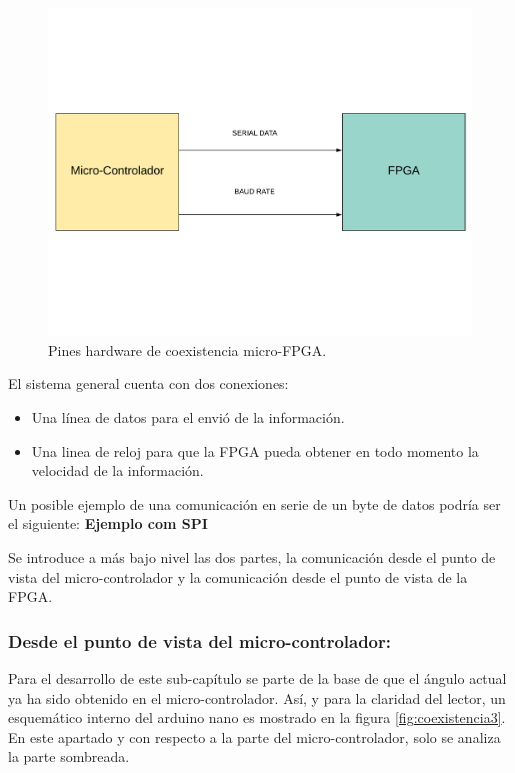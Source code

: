 \begin{figure}[H]
	\center
	\includegraphics[trim = 0mm 40mm 0mm 20mm, clip,scale=0.4]{imagenes/Balancing_robot/coexistencia2.pdf}
	\caption{Pines hardware de coexistencia micro-FPGA.}
	\label{fig:coexistencia2}
\end{figure}
El sistema general cuenta con dos conexiones:
\begin{itemize}
	\item Una línea de datos para el envió de la información.
	\item Una linea de reloj para que la FPGA pueda obtener en todo momento la velocidad de la información.
\end{itemize}

Un posible ejemplo de una comunicación en serie de un byte de datos podría ser el siguiente: 
\textbf{Ejemplo com SPI}


Se introduce a más bajo nivel las dos partes, la comunicación desde el punto de vista del micro-controlador y la comunicación desde el punto de vista de la FPGA. 

\subsubsection{Desde el punto de vista del micro-controlador:}

Para el desarrollo de este sub-capítulo se parte de la base de que el ángulo actual ya ha sido obtenido en el micro-controlador. Así, y para la claridad del lector, un esquemático interno del arduino nano es mostrado en la figura \ref{fig:coexistencia3}. En este apartado y con respecto a la parte del micro-controlador, solo se analiza la parte sombreada.  

